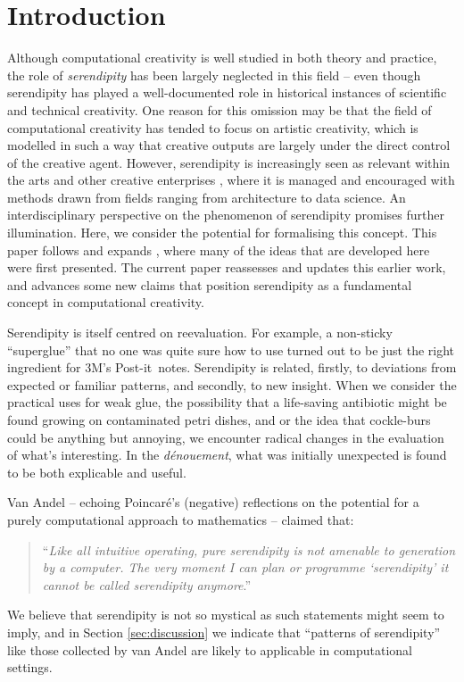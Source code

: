 \section{Introduction}

Although computational creativity is well studied in both theory and
practice, the role of \emph{serendipity} has been largely neglected
in this field -- even though serendipity has played a well-documented
role in historical instances of scientific and technical creativity.
One reason for this omission may be that the field of computational
creativity has tended to focus on artistic creativity, which is modelled in such a way that creative outputs are largely under the direct control of the creative agent.  However,  
serendipity is increasingly seen as relevant within the arts
\cite{mckay-serendipity} and other creative enterprises
\cite{kakko2009homo,engineering-serendipity}, where it is managed and
encouraged with methods drawn from fields ranging from architecture to data science.
%
An interdisciplinary perspective on the phenomenon of serendipity
promises further illumination.  Here, we consider the potential for
formalising this concept.  This paper follows and expands , where many of the ideas that are developed here were first presented.  The current paper reassesses and updates this earlier work, and advances some new claims that position serendipity as a fundamental concept in computational creativity.

Serendipity is itself centred on reevaluation.  For example, a
non-sticky ``superglue'' that no one was quite sure how to use turned
out to be just the right ingredient for 3M's
Post-it\texttrademark\ notes.
%
Serendipity is related, firstly, to deviations from expected or
familiar patterns, and secondly, to new insight.
%
When we consider the practical uses for weak glue, the possibility
that a life-saving antibiotic might be found growing on contaminated
petri dishes, and or the idea that cockle-burs could be anything but
annoying, we encounter radical changes in the evaluation of what's
interesting.  In the \emph{d\'enouement}, what was initially
unexpected is found to be both explicable and useful.

Van Andel \citeyear{van1994anatomy} -- echoing Poincar\'e's
\citeyear{poincare1910creation} (negative) reflections on the potential
for a purely computational approach to mathematics -- claimed that:
\begin{quote}
``\emph{Like all intuitive operating, pure serendipity is not amenable
    to generation by a computer.  The very moment I can plan or
    programme `serendipity' it cannot be called serendipity
    anymore}.'' \cite{van1994anatomy}
\end{quote}
We believe that serendipity is not so mystical as such statements
might seem to imply, and in Section \ref{sec:discussion} we indicate
that ``patterns of serendipity'' like those collected by van Andel
are likely to applicable in computational settings.

